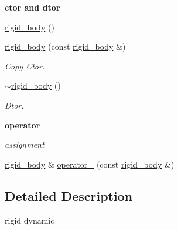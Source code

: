 \begin{Indent}{\bf ctor and dtor}\par
{\em \label{_amgrp98fbd3e5ae66fcd014fb744fec76c58d}
 }\begin{DoxyCompactItemize}
\item 
\hyperlink{classnebula_1_1content_1_1actor_1_1renderer_1_1rigid__body_a4426ca8f44892062a0ade68cea759888}{rigid\_\-body} ()
\item 
\hyperlink{classnebula_1_1content_1_1actor_1_1renderer_1_1rigid__body_a708c13e330df06ee169b9c7a7755f406}{rigid\_\-body} (const \hyperlink{classnebula_1_1content_1_1actor_1_1renderer_1_1rigid__body}{rigid\_\-body} \&)
\begin{DoxyCompactList}\small\item\em Copy Ctor. \item\end{DoxyCompactList}\item 
\hyperlink{classnebula_1_1content_1_1actor_1_1renderer_1_1rigid__body_aae25a1cd57c2de29eda7b723f145f3ab}{$\sim$rigid\_\-body} ()
\begin{DoxyCompactList}\small\item\em Dtor. \item\end{DoxyCompactList}\end{DoxyCompactItemize}
\end{Indent}
\begin{Indent}{\bf operator}\par
{\em \label{_amgrp4b583376b2767b923c3e1da60d10de59}
 assignment }\begin{DoxyCompactItemize}
\item 
\hyperlink{classnebula_1_1content_1_1actor_1_1renderer_1_1rigid__body}{rigid\_\-body} \& \hyperlink{classnebula_1_1content_1_1actor_1_1renderer_1_1rigid__body_a448e47741d24ba24fbedbd7438159a12}{operator=} (const \hyperlink{classnebula_1_1content_1_1actor_1_1renderer_1_1rigid__body}{rigid\_\-body} \&)
\end{DoxyCompactItemize}
\end{Indent}


\subsection{Detailed Description}
rigid dynamic 

